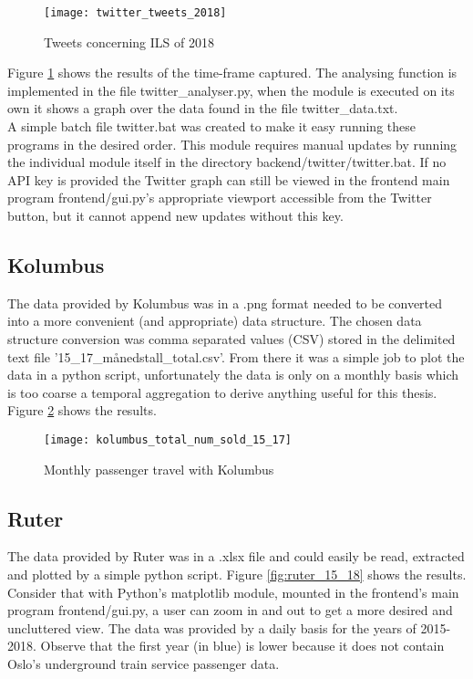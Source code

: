 \begin{figure}[ht]
\texttt{[image: twitter\_tweets\_2018]}
\centering
\caption{Tweets concerning ILS of 2018}
\label{fig:twitterAnal}
\end{figure}

Figure \ref{fig:twitterAnal} shows the results of the time-frame captured. The analysing function is implemented in the file twitter\_analyser.py, when the module is executed on its own it shows a graph over the data found in the file twitter\_data.txt.\\
A simple batch file twitter.bat was created to make it easy running these programs in the desired order. This module requires manual updates by running the individual module itself in the directory backend/twitter/twitter.bat. If no API key is provided the Twitter graph can still be viewed in the frontend main program frontend/gui.py's appropriate viewport accessible from the Twitter button, but it cannot append new updates without this key.


\newpage





\subsection{Kolumbus}
The data provided by Kolumbus was in a .png format needed to be converted into a more convenient (and appropriate) data structure. The chosen data structure conversion was comma separated values (CSV) stored in the delimited text file '15\_17\_månedstall\_total.csv'. From there it was a simple job to plot the data in a python script, unfortunately the data is only on a monthly basis which is too coarse a temporal aggregation to derive anything useful for this thesis. Figure \ref{fig:kolumbus_15_17} shows the results.

\begin{figure}[!htb]
\texttt{[image: kolumbus\_total\_num\_sold\_15\_17]}
\centering
\caption{Monthly passenger travel with Kolumbus}
\label{fig:kolumbus_15_17}
\end{figure}




\subsection{Ruter}
The data provided by Ruter was in a .xlsx file and could easily be read, extracted and plotted by a simple python script. Figure \ref{fig:ruter_15_18} shows the results. Consider that with Python's matplotlib module, mounted in the frontend's main program frontend/gui.py, a user can zoom in and out to get a more desired and uncluttered view. The data was provided by a daily basis for the years of 2015-2018. Observe that the first year (in blue) is lower because it does not contain Oslo's underground train service passenger data.

